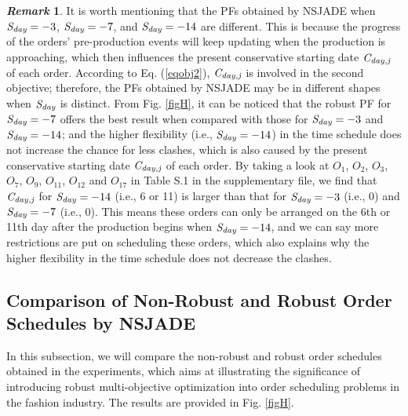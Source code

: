 \documentclass[journal]{IEEEtran}
\theoremstyle{definition}
\newtheorem{remark}{\it Remark}
\begin{document}
\begin{remark}
It is worth mentioning that the PFs obtained by NSJADE when $\emph{S}_\emph{day}=-3$, $\emph{S}_\emph{day}=-7$, and $\emph{S}_\emph{day}=-14$ are different. This is because the progress of the orders' pre-production events will keep updating when the production is approaching, which then influences the present conservative starting date $\emph{C}_\emph{day,j}$ of each order. According to Eq. (\ref{eqobj2}), $\emph{C}_\emph{day,j}$ is involved in the second objective; therefore, the PFs obtained by NSJADE may be in different shapes when $\emph{S}_\emph{day}$ is distinct. From Fig. \ref{figH}, it can be noticed that the robust PF for $\emph{S}_\emph{day}=-7$ offers the best result when compared with those for $\emph{S}_\emph{day}=-3$ and $\emph{S}_\emph{day}=-14$; and the higher flexibility (i.e., $\emph{S}_\emph{day}=-14$) in the time schedule does not increase the chance for less clashes, which is also caused by the present conservative starting date $\emph{C}_\emph{day,j}$ of each order. By taking a look at $O_{1}$, $O_{2}$, $O_{3}$, $O_{7}$, $O_{9}$, $O_{11}$, $O_{12}$ and $O_{17}$ in Table S.1 in the supplementary file, we find that $\emph{C}_\emph{day,j}$ for $\emph{S}_\emph{day}=-14$ (i.e., 6 or 11) is larger than that for $\emph{S}_\emph{day}=-3$ (i.e., 0) and $\emph{S}_\emph{day}=-7$ (i.e., 0). This means these orders can only be arranged on the 6th or 11th day after the production begins when $\emph{S}_\emph{day}=-14$, and we can say more restrictions are put on scheduling these orders, which also explains why the higher flexibility in the time schedule does not decrease the clashes.
\end{remark}

\subsection{Comparison of Non-Robust and Robust Order Schedules by NSJADE}\label{secd}
In this subsection, we will compare the non-robust and robust order schedules obtained in the experiments, which aims at illustrating the significance of introducing robust multi-objective optimization into order scheduling problems in the fashion industry. The results are provided in Fig. \ref{figH}.
\end{document}
